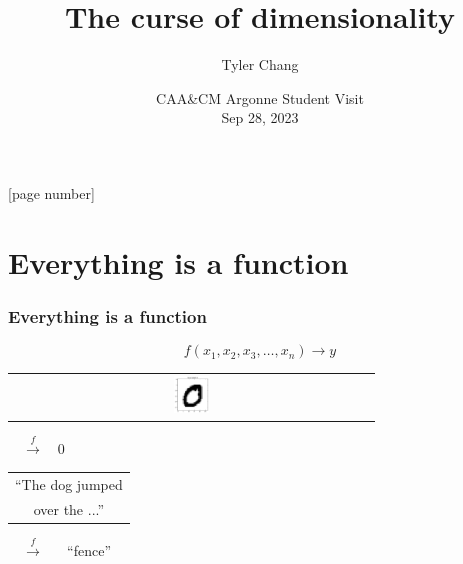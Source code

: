 \documentclass[aspectratio=169]{beamer}
\title{The curse of dimensionality}
\author{Tyler Chang}
\date{CAA\&CM Argonne Student Visit\\
Sep 28, 2023}
\institute{Argonne National Laboratory}
\begin{document}
{
\frame{\titlepage}
}

[page number]{}


\section{Everything is a function}

\begin{frame}\frametitle{Everything is a function}

\pause
{\large
$$
f(x_1, x_2, x_3, \ldots, x_n) \rightarrow y
$$
}

\pause
\bigskip

\begin{tabular}{c}
\includegraphics[width=0.1\textwidth]{../img/delaunay_new/mnist_data_0.png}
\end{tabular}
{\huge $\quad \xrightarrow{ f } \quad 0$}
$\qquad\qquad\quad$
\pause
\begin{tabular}{c}
{\large ``The dog jumped}\\
{\large over the ...''}
\end{tabular}
{\huge $\quad \xrightarrow{ f }$}
{\large $\quad$ ``fence''}
\end{frame}
\end{document}

